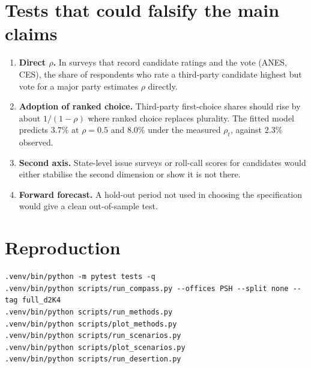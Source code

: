 \documentclass[11pt]{article}
\begin{document}
\section{Tests that could falsify the main claims}
\begin{enumerate}\itemsep2pt
\item \textbf{Direct $\rho$.} In surveys that record candidate ratings and the vote (ANES, CES), the share of respondents who rate a third-party candidate highest but vote for a major party estimates $\rho$ directly.
\item \textbf{Adoption of ranked choice.} Third-party first-choice shares should rise by about $1/(1-\rho)$ where ranked choice replaces plurality. The fitted model predicts $3.7\%$ at $\rho=0.5$ and $8.0\%$ under the measured $\rho_t$, against $2.3\%$ observed.
\item \textbf{Second axis.} State-level issue surveys or roll-call scores for candidates would either stabilise the second dimension or show it is not there.
\item \textbf{Forward forecast.} A hold-out period not used in choosing the specification would give a clean out-of-sample test.
\end{enumerate}

\section*{Reproduction}
{\small
\begin{verbatim}
.venv/bin/python -m pytest tests -q
.venv/bin/python scripts/run_compass.py --offices PSH --split none --tag full_d2K4
.venv/bin/python scripts/run_methods.py
.venv/bin/python scripts/plot_methods.py
.venv/bin/python scripts/run_scenarios.py
.venv/bin/python scripts/plot_scenarios.py
.venv/bin/python scripts/run_desertion.py
\end{verbatim}}
\end{document}
